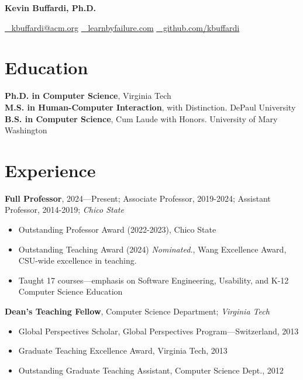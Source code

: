 \documentclass[10pt,letterpaper]{article}
\begin{document}
\begin{center}
{\LARGE\bfseries Kevin Buffardi, Ph.D.}\par
\vspace{0.25em}
{\small\href{mailto:kbuffardi@acm.org}{\faEnvelope~ kbuffardi@acm.org}
\enspace\textbar\enspace
\href{https://learnbyfailure.com}{\faGlobe~ learnbyfailure.com}
\enspace\textbar\enspace
\href{https://github.com/kbuffardi}{\faGithub~ github.com/kbuffardi}}
\end{center}

\section*{Education} 
\textbf{Ph.D. in Computer Science}, Virginia Tech \\
\textbf{M.S. in Human-Computer Interaction}, with Distinction. DePaul University \\
\textbf{B.S. in Computer Science}, Cum Laude with Honors. University of Mary Washington

\section*{Experience}
\textbf{Full Professor}, 2024---Present; Associate Professor, 2019-2024; Assistant Professor, 2014-2019; \textit{Chico State}
\begin{itemize}[leftmargin=1.5em,itemsep=2pt, topsep=0pt]
\item Outstanding Professor Award (2022-2023), Chico State
\item Outstanding Teaching Award (2024) \textit{Nominated.}, Wang Excellence Award, CSU-wide excellence in teaching. 
\item Taught 17 courses---emphasis on Software Engineering, Usability, and K-12 Computer Science Education
\end{itemize}

\vspace{2mm}
\textbf{Dean's Teaching Fellow}, Computer Science Department; \textit{Virginia Tech}
\begin{itemize}[leftmargin=1.5em,itemsep=2pt, topsep=0pt]
\item Global Perspectives Scholar, Global Perspectives Program---Switzerland, 2013
\item Graduate Teaching Excellence Award, Virginia Tech, 2013
\item Outstanding Graduate Teaching Assistant, Computer Science Dept., 2012
\end{itemize}
\end{document}
